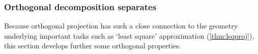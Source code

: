 






\subsubsection{Orthogonal decomposition separates}

Because orthogonal projection has such a close connection to the geometry underlying important tasks such as `least square' approximation (\cref{thm:lsqproj}), this section develops further some orthogonal properties.

